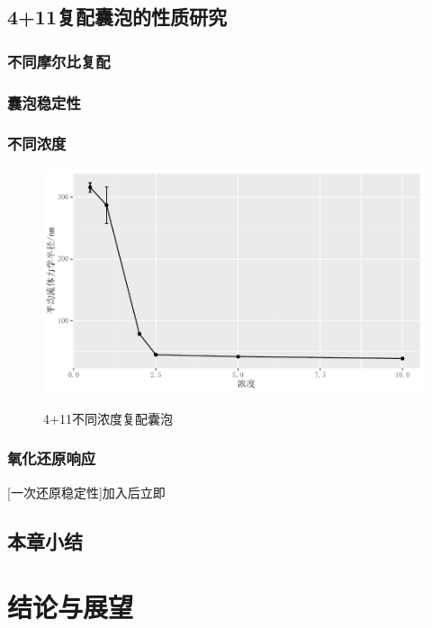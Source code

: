 \documentclass[bachelor,fandolfonts,replaceperiod]{jnuthesis} %
\begin{document}
    \section{4+11复配囊泡的性质研究}
    \subsection{不同摩尔比复配}
    
    \subsection{囊泡稳定性}
    
    \subsection{不同浓度}
    \begin{figure}[htbp]
        \centering
        \includegraphics[width=0.8\linewidth]{Figure/test.pdf}\\
        \caption{4+11不同浓度复配囊泡}\label{fig:vesicle-concentration-line}
    \end{figure}
    \subsection{氧化还原响应}
    
    
    [一次还原稳定性]加入后立即
    \section{本章小结}

    \chapter{结论与展望}\label{chapter:concludes}
\end{document}

